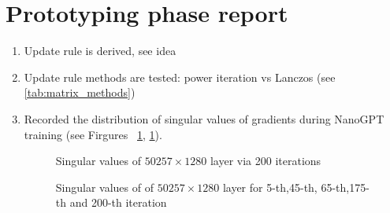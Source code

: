 \documentclass{article} %
\begin{document}
\section{Prototyping phase report}
\begin{enumerate}
    \item Update rule is derived, see idea
    \item Update rule methods are tested: power iteration vs Lanczos (see \ref{tab:matrix_methods})
    \item Recorded the distribution of singular values of gradients during NanoGPT training (see Firgures ~\ref{fig:svd_all}, \ref{fig:svd_all}).
    \begin{figure}[h!]
        \caption{Singular values of $50257\times 1280$ layer via 200 iterations}
        \label{fig:svd_all}
    \end{figure}
    \begin{figure}[h!]
        \caption{Singular values of  of $50257\times 1280$ layer for 5-th,45-th, 65-th,175-th and 200-th iteration}
        \label{fig:svd}
    \end{figure} 
    

\end{enumerate}
\end{document}
